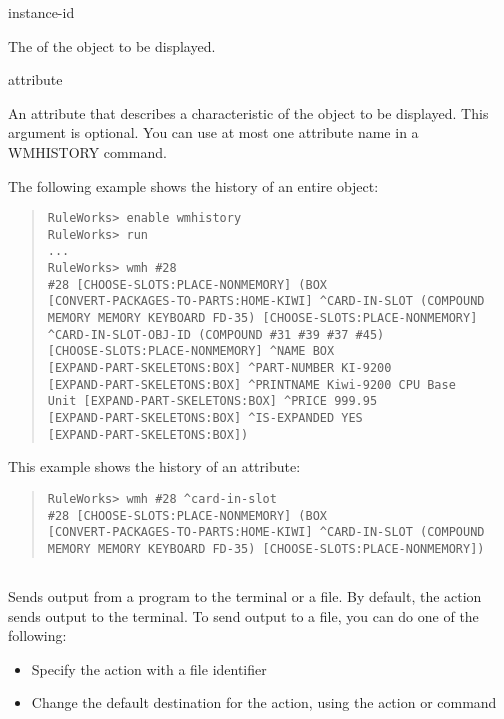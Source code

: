 {{\begin{arguments}
\item[instance-id]

  The  of the object to be displayed.

\item[attribute]

  An attribute that describes a characteristic of the object to be
  displayed. This argument is optional. You can use at most one
  attribute name in a WMHISTORY command.
\end{arguments}

\Example

The following example shows the history of an entire object:

\begin{quote}
\begin{verbatim}
RuleWorks> enable wmhistory
RuleWorks> run
...
RuleWorks> wmh #28
#28 [CHOOSE-SLOTS:PLACE-NONMEMORY] (BOX
[CONVERT-PACKAGES-TO-PARTS:HOME-KIWI] ^CARD-IN-SLOT (COMPOUND
MEMORY MEMORY KEYBOARD FD-35) [CHOOSE-SLOTS:PLACE-NONMEMORY]
^CARD-IN-SLOT-OBJ-ID (COMPOUND #31 #39 #37 #45)
[CHOOSE-SLOTS:PLACE-NONMEMORY] ^NAME BOX
[EXPAND-PART-SKELETONS:BOX] ^PART-NUMBER KI-9200
[EXPAND-PART-SKELETONS:BOX] ^PRINTNAME Kiwi-9200 CPU Base
Unit [EXPAND-PART-SKELETONS:BOX] ^PRICE 999.95
[EXPAND-PART-SKELETONS:BOX] ^IS-EXPANDED YES
[EXPAND-PART-SKELETONS:BOX])
\end{verbatim}
\end{quote}

This example shows the history of an attribute:

\begin{quote}
\begin{verbatim}
RuleWorks> wmh #28 ^card-in-slot
#28 [CHOOSE-SLOTS:PLACE-NONMEMORY] (BOX
[CONVERT-PACKAGES-TO-PARTS:HOME-KIWI] ^CARD-IN-SLOT (COMPOUND
MEMORY MEMORY KEYBOARD FD-35) [CHOOSE-SLOTS:PLACE-NONMEMORY])
\end{verbatim}
\end{quote}

\subsection{}

Sends output from a program to the terminal or a file. By
default, the  action sends output to the terminal. To
send output to a file, you can do one of the following:

\begin{itemize}
\item Specify the  action with a file identifier
\item Change the default destination for the  action, using
  the  action or command
\end{itemize}

}}
